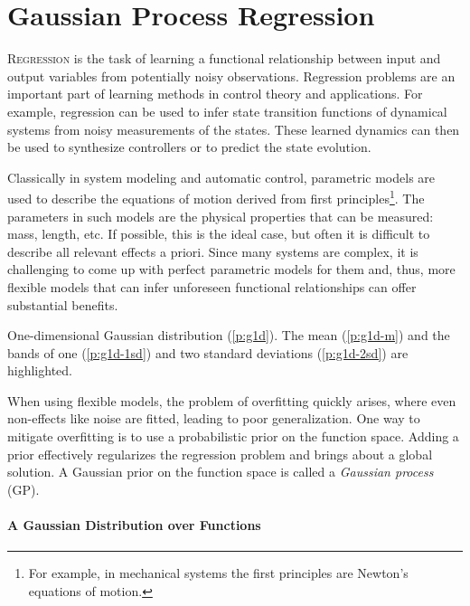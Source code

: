 \chapter{Gaussian Process Regression}
\label{ch:gaussian-processes}

\lettrine{R}{egression} is the task of learning a functional relationship
between input and output variables from potentially noisy observations.
Regression problems are an important part of learning methods in control theory
and applications. For example, regression can be used to infer state transition
functions of dynamical systems from noisy measurements of the states. These
learned dynamics can then be used to synthesize controllers or to predict
the state evolution.

Classically in system modeling and automatic control, parametric models are
used to describe the equations of motion derived from first
principles\footnote{For example, in mechanical systems the first principles are
Newton's equations of motion.}. The parameters in such models are the physical
properties that can be measured: mass, length, etc. If possible, this is the
ideal case, but often it is difficult to describe all relevant effects a
priori. Since many systems are complex, it is challenging to come up with
perfect parametric models for them and, thus, more flexible models that can
infer unforeseen functional relationships can offer substantial benefits.

\begin{marginfigure}
\setlength\figurewidth{\columnwidth}%
\setlength\figureheight{0.618\figurewidth}%
  \caption[One-dimensional Gaussian distribution.]{One-dimensional Gaussian
distribution (\ref*{p:g1d}). The mean (\ref*{p:g1d-m}) and the bands of one
(\ref*{p:g1d-1sd}) and two standard deviations (\ref*{p:g1d-2sd}) are
highlighted.\vspace{\baselineskip}}
  \label{fig:1d-gauss}
\end{marginfigure}

When using flexible models, the problem of overfitting quickly arises, where
even non-effects like noise are fitted, leading to poor generalization. One way
to mitigate overfitting is to use a probabilistic prior on the function space.
Adding a prior effectively regularizes the regression problem and brings about a
global solution. A Gaussian prior on the function space is called a
\emph{Gaussian process} (GP).

\subsubsection{A Gaussian Distribution over Functions}

